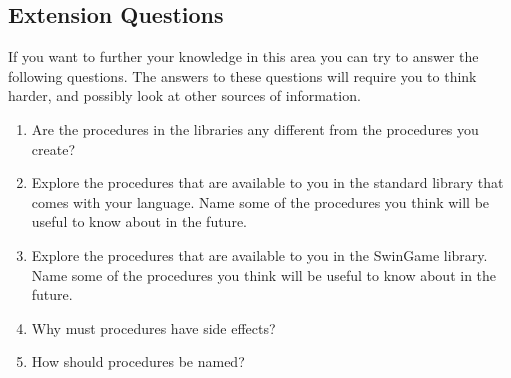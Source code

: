 \bigskip
\subsection{Extension Questions} %
\label{sub:extension_questions_proc}

If you want to further your knowledge in this area you can try to answer the following questions. The answers to these questions will require you to think harder, and possibly look at other sources of information.
\begin{enumerate}
  \item Are the procedures in the libraries any different from the procedures you create?
  \item Explore the procedures that are available to you in the standard library that comes with your language. Name some of the procedures you think will be useful to know about in the future.
  \item Explore the procedures that are available to you in the SwinGame library. Name some of the procedures you think will be useful to know about in the future.
  \item Why must procedures have side effects?
  \item How should procedures be named?
\end{enumerate}

